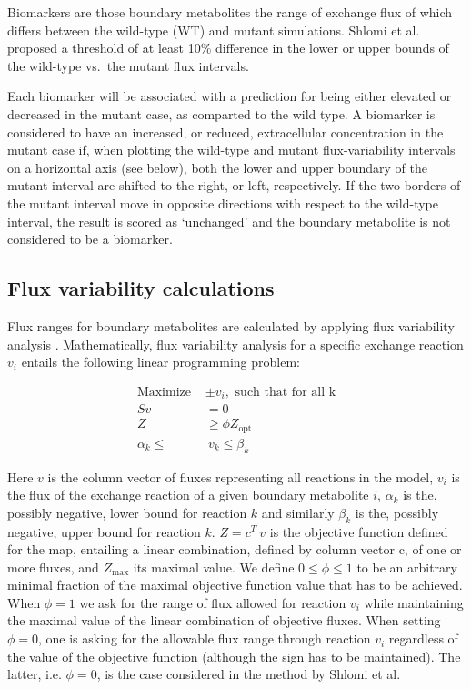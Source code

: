 \documentclass[10pt,a4paper,onecolumn]{article}
\begin{document}
Biomarkers are those boundary metabolites the range of exchange flux of
which differs between the wild-type (WT) and mutant simulations. Shlomi
et al. proposed a threshold of at least 10\% difference in the lower or
upper bounds of the wild-type vs.~the mutant flux intervals.

Each biomarker will be associated with a prediction for being either
elevated or decreased in the mutant case, as comparted to the wild type.
A biomarker is considered to have an increased, or reduced,
extracellular concentration in the mutant case if, when plotting the
wild-type and mutant flux-variability intervals on a horizontal axis
(see below), both the lower and upper boundary of the mutant interval
are shifted to the right, or left, respectively. If the two borders of
the mutant interval move in opposite directions with respect to the
wild-type interval, the result is scored as `unchanged' and the boundary
metabolite is not considered to be a biomarker.

\subsection{Flux variability
calculations}\label{flux-variability-calculations}

Flux ranges for boundary metabolites are calculated by applying flux
variability analysis \autocite{Mahadevan2003}. Mathematically, flux
variability analysis for a specific exchange reaction \(v_i\) entails
the following linear programming problem:

\begin{align}
\text{Maximize } &\pm v_i, \text{ such that for all k} \nonumber \\
S v &= 0 \nonumber \\
Z  &\geq \phi Z_{\text{opt}} \nonumber \\
\alpha_k \leq & ~ v_k \leq \beta_k 
\end{align}

Here \(v\) is the column vector of fluxes representing all reactions in
the model, \(v_i\) is the flux of the exchange reaction of a given
boundary metabolite \(i\), \(\alpha_k\) is the, possibly negative, lower
bound for reaction \(k\) and similarly \(\beta_k\) is the, possibly
negative, upper bound for reaction \(k\). \(Z = c^T ~ v\) is the
objective function defined for the map, entailing a linear combination,
defined by column vector c, of one or more fluxes, and
\(Z_{\text{max}}\) its maximal value. We define \(0 \leq \phi \leq 1\)
to be an arbitrary minimal fraction of the maximal objective function
value that has to be achieved. When \(\phi=1\) we ask for the range of
flux allowed for reaction \(v_i\) while maintaining the maximal value of
the linear combination of objective fluxes. When setting \(\phi = 0\),
one is asking for the allowable flux range through reaction \(v_i\)
regardless of the value of the objective function (although the sign has
to be maintained). The latter, i.e. \(\phi=0\), is the case considered
in the method by Shlomi et al.
\end{document}
